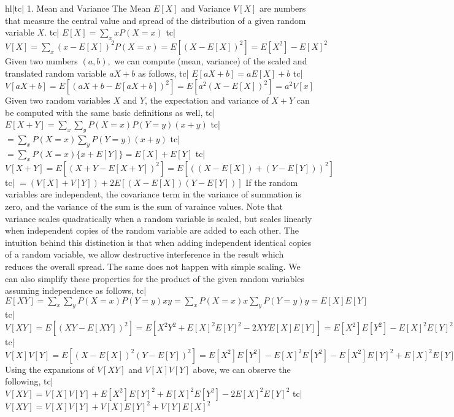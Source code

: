 hl|tc| 1. Mean and Variance
The Mean \(E[X]\) and Variance \(V[X]\) are numbers that measure the central value and spread of the distribution of a given random variable \(X\).
tc| \(E[X]=\sum_x xP(X=x)\)
tc| \(V[X] = \sum_x (x - E[X])^2 P(X=x) = E[(X-E[X])^2] = E[X^2] - E[X]^2 \)
Given two numbers \((a, b),\) we can compute (mean, variance) of the scaled and translated random variable \(aX+b\) as follows,
tc| \(E[aX+b] = aE[X]+b\)
tc| \(V[aX+b] = E[(aX+b-E[aX+b])^2] = E[a^2(X-E[X])^2] = a^2V[x]\)
Given two random variables \(X\) and \(Y\), the expectation and variance of \(X+Y\) can be computed with the same basic definitions as well,
tc| \( E[X+Y] = \sum_x \sum_y P(X=x) P(Y=y) (x+y)\)
tc| \( = \sum_x P(X=x) \sum_y P(Y=y) (x+y) \)
tc| \( = \sum_x P(X=x) \{x + E[Y]\} = E[X] + E[Y] \)
tc| \( V[X+Y] = E[(X+Y - E[X+Y])^2] = E[((X-E[X])+(Y-E[Y]))^2] \)
tc| \(= (V[X] + V[Y]) + 2E[(X-E[X])(Y-E[Y])] \)
If the random variables are independent, the covariance term in the variance of summation is zero, and the variance of the sum is the sum of varaince values. Note that variance scales quadratically when a random variable is scaled, but scales linearly when independent copies of the random variable are added to each other. The intuition behind this distinction is that when adding independent identical copies of a random variable, we allow destructive interference in the result which reduces the overall spread. The same does not happen with simple scaling.
We can also simplify these properties for the product of the given random variables assuming independence as follows,
tc| \( E[XY] = \sum_x \sum_y P(X=x)P(Y=y) xy = \sum_x P(X=x)x \sum_y P(Y=y)y = E[X]E[Y] \)
tc| \( V[XY] = E\left[ (XY-E[XY])^2 \right] = E\left[X^2Y^2 + E[X]^2 E[Y]^2 - 2XYE[X]E[Y] \right] = E[X^2]E[Y^2] - E[X]^2E[Y]^2 \)
tc| \( V[X]V[Y] = E\left[(X-E[X])^2(Y-E[Y])^2 \right] = E[X^2]E[Y^2] - E[X]^2E[Y^2] - E[X^2]E[Y]^2 + E[X]^2E[Y]^2 \)
Using the expansions of \(V[XY]\) and \(V[X]V[Y]\) above, we can observe the following,
tc| \( V[XY] = V[X]V[Y] + E[X^2]E[Y]^2 + E[X]^2E[Y^2] - 2E[X]^2E[Y]^2 \)
tc| \( V[XY] = V[X]V[Y] + V[X]E[Y]^2 + V[Y]E[X]^2 \)